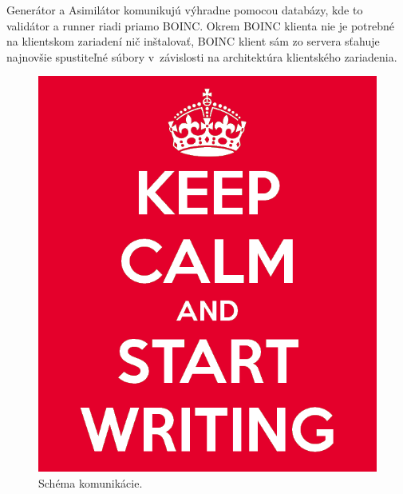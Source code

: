 Generátor a Asimilátor komunikujú výhradne pomocou databázy, kde to validátor a runner riadi priamo BOINC.
Okrem BOINC klienta nie je potrebné na klientskom zariadení nič inštalovať, BOINC klient sám zo servera sťahuje najnovšie spustiteľné súbory v~závislosti na architektúra klientského zariadenia.

\begin{figure}[H]
	\centering
	\includegraphics[width=\textwidth]{obrazky/keep-calm.png}
	\caption{Schéma komunikácie.}
\end{figure}

